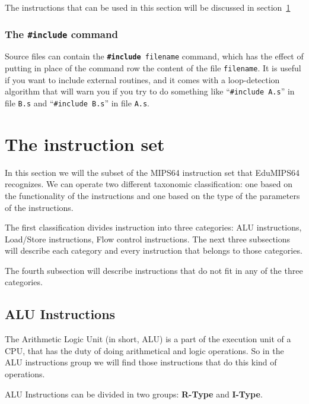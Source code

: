 \documentclass[12pt]{report}
\newcommand{\EM}{EduMIPS64}
\newcommand{\MS}{MIPS64}
\begin{document}
The instructions that can be used in this section will be discussed in
section~\ref{instructions}

\subsection{The \texttt{\#include} command}
Source files can contain the \texttt{\textbf{\#include} filename} command, which has the
effect of putting in place of the command row the content of the file
\texttt{filename}.
It is useful if you want to include external routines, and it comes with a
loop-detection algorithm that will warn you if you try to do something like
``\texttt{\#include A.s}'' in file \texttt{B.s} and ``\texttt{\#include B.s}'' in
file \texttt{A.s}.

\chapter{The instruction set}
\label{instructions}

In this section we will the subset of the \MS{} instruction set that \EM{}
recognizes. We can operate two different taxonomic classification: one based on
the functionality of the instructions and one based on the type of the
parameters of the instructions. 


The first classification divides instruction into three categories:
ALU instructions, Load/Store instructions, Flow control instructions. The next
three subsections will describe each category and every instruction that belongs
to those categories.

The fourth subsection will describe instructions that do not fit in any of the
three categories.



\section{ALU Instructions}
The Arithmetic Logic Unit (in short, ALU) is a part of the execution unit of a
CPU, that has the duty of doing arithmetical and logic operations. So in the ALU
instructions group we will find those instructions that do this kind of
operations.

ALU Instructions can be divided in two groups: \textbf{R-Type} and
\textbf{I-Type}. 
\end{document}
